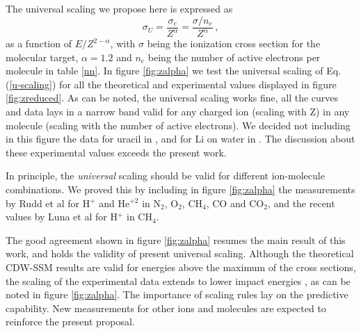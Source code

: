 \documentclass[10pt,showpacs,showkeys,twocolumn]{revtex4}
\begin{document}
 
The universal scaling we propose here is expressed as
 \begin{equation}
     \sigma_U=\frac{\sigma_e}{Z^{\alpha}}=\frac{\sigma/n_e}{Z^{\alpha}}\,,
     \label{u-scaling}
 \end{equation}
as a function of $E/Z^{2-\alpha}$, with $\sigma$ being the ionization cross section for the molecular target, $\alpha=1.2$ and  $n_e$ being the number of active electrons per molecule in table \ref{nn}. %
In figure \ref{fig:zalpha} we test the universal scaling of Eq. (\ref{u-scaling}) %
for all the theoretical and experimental values displayed in figure \ref{fig:zreduced}. 
As can be noted, the universal scaling works fine, all the curves and data lays in a narrow band valid for any charged ion (scaling with Z) in any molecule (scaling with the number of active electrons). We decided not including in this figure the data  for uracil in \cite{agnihotri2012,agnihotri2013}, and for Li on water in \cite{Luna_Li_water}. The discussion about these experimental values exceeds the present work. %


In principle, the \textit{universal} scaling should be valid for different ion-molecule combinations. 
We proved this by including in figure \ref{fig:zalpha} the measurements by Rudd et al \cite{Rudd85,Rudd1983} for H$^{+}$ and He$^{+2}$ in N$_2$, O$_2$, CH$_4$, CO and CO$_2$, and the recent values by Luna et al \cite{Luna2019} for H$^{+}$ in CH$_4$. 

The good agreement shown in figure \ref{fig:zalpha} resumes the main result of this work, and holds the validity of present universal scaling. Although the theoretical CDW-SSM results  %
are valid for energies above the maximum of the cross sections, the scaling of the experimental data extends to lower impact energies%
, as can be noted in figure \ref{fig:zalpha}.
The importance of scaling rules lay on the predictive capability. New measurements for other ions and molecules are expected to reinforce the present proposal. 

\end{document}
